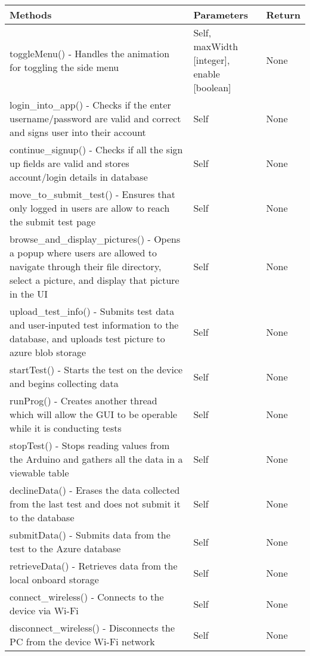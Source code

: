 \documentclass[12pt, titlepage]{article}
\begin{document}
      \noindent \begin{tabular}{| p{} | p{}| p{}|}
        \hline
        \rowcolor[gray]{0.9}
        Methods & Parameters & Return\\
        \hline
        toggleMenu() - Handles the animation for toggling the side menu &Self, maxWidth [integer], enable [boolean] & None \\
        \hline
        login\_into\_app() - Checks if the enter username/password are valid and correct and signs user into their account & Self & None \\
        \hline
        continue\_signup() - Checks if all the sign up fields are valid and stores account/login details in database & Self & None \\
        \hline
        move\_to\_submit\_test() - Ensures that only logged in users are allow to reach the submit test page & Self & None \\
        \hline
        browse\_and\_display\_pictures() - Opens a popup where users are allowed to navigate through their file directory, select a picture, and display that picture in the UI & Self & None\\
        \hline
        upload\_test\_info() - Submits test data and user-inputed test information to the database, and uploads test picture to azure blob storage & Self & None \\
        \hline
        startTest() - Starts the test on the device and begins collecting data & Self & None\\
        \hline
        runProg() - Creates another thread which will allow the GUI to be operable while it is conducting tests & Self & None\\
        \hline
        stopTest() - Stops reading values from the Arduino and gathers all the data in a viewable table & Self & None\\
        \hline
        declineData() - Erases the data collected from the last test and does not submit it to the database & Self & None\\
        \hline
        submitData() - Submits data from the test to the Azure database & Self & None\\
        \hline
        retrieveData() - Retrieves data from the local onboard storage & Self & None\\
        \hline
        connect\_wireless() - Connects to the device via Wi-Fi & Self & None\\
        \hline
        disconnect\_wireless() - Disconnects the PC from the device Wi-Fi network & Self & None\\

\end{tabular}
\end{document}
